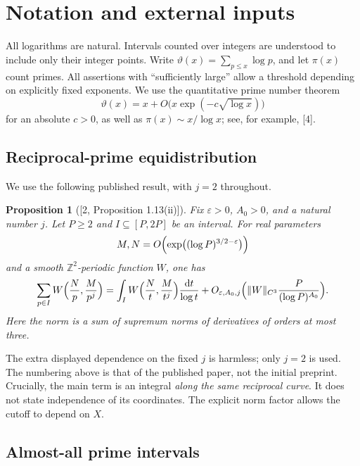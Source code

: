 \documentclass[letterpaper]{article}
\newtheorem{proposition}[theorem]{Proposition}
\theoremstyle{definition}
\theoremstyle{remark}
\numberwithin{equation}{section}
\begin{document}
\section{Notation and external inputs}

All logarithms are natural. Intervals counted over integers are understood to include only
their integer points. Write $\vartheta(x)=\sum_{p\le x}\log p$, and let $\pi(x)$ count primes. All assertions with
``sufficiently large'' allow a threshold depending on explicitly fixed exponents. We use the
quantitative prime number theorem
\begin{equation}
  \vartheta(x)=x+O\bigl(x\exp(-c\sqrt{\log x})\bigr)
\end{equation}
for an absolute $c>0$, as well as $\pi(x)\sim x/\log x$; see, for example, [4].

\subsection{Reciprocal-prime equidistribution}

We use the following published result, with $j=2$ throughout.

\begin{proposition}[{[2, Proposition 1.13(ii)]}]
Fix $\varepsilon>0$, $A_0>0$, and a natural number $j$. Let
$P\ge 2$ and $I\subseteq[P,2P]$ be an interval. For real parameters
\[
  M,N=O\Bigl(\exp\bigl((\log P)^{3/2-\varepsilon}\bigr)\Bigr)
\]
and a smooth $\mathbb Z^2$-periodic function $W$, one has
\begin{equation}
  \sum_{p\in I}W\Bigl(\frac Np,\frac M{p^j}\Bigr)
  =\int_I W\Bigl(\frac Nt,\frac M{t^j}\Bigr)\frac{\mathrm dt}{\log t}
  +O_{\varepsilon,A_0,j}\Bigl(\|W\|_{C^3}\frac{P}{(\log P)^{A_0}}\Bigr).
\end{equation}
Here the norm is a sum of supremum norms of derivatives of orders at most three.
\end{proposition}

The extra displayed dependence on the fixed $j$ is harmless; only $j=2$ is used. The numbering
above is that of the published paper, not the initial preprint. Crucially, the main term is an
integral \emph{along the same reciprocal curve}. It does not state independence of its coordinates. The
explicit norm factor allows the cutoff to depend on $X$.

\subsection{Almost-all prime intervals}
\end{document}
